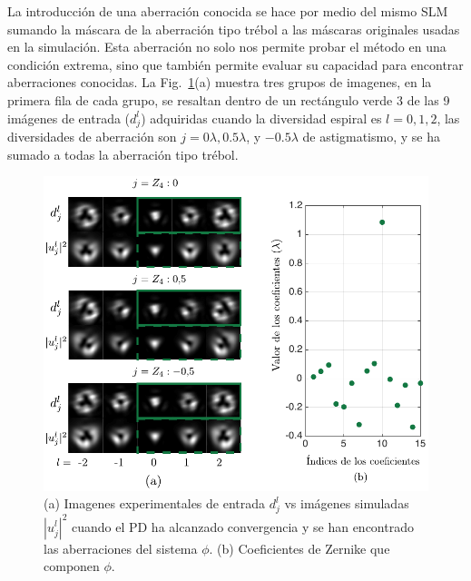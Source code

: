 La introducción de una aberración conocida se hace por medio del mismo
SLM sumando la máscara de la aberración tipo trébol a las máscaras 
originales usadas en la simulación. %
Esta aberración no solo nos permite probar el
método en una condición extrema, sino que también permite evaluar
su capacidad para encontrar aberraciones conocidas. 
La Fig.~\ref{fig:exp_results}(a) muestra tres grupos de imagenes, en
la primera fila de cada grupo, se resaltan dentro
de un rectángulo verde 3 de las 9 imágenes de entrada ($d_j^l$)
adquiridas cuando la diversidad espiral es $l=0,1,2$, las diversidades
de aberración son $j = 0\lambda, 0.5\lambda$, y  $-0.5\lambda$ de
astigmatismo, y se ha sumado a todas la aberración tipo trébol.   
\begin{figure}[h!]
\centering
\includegraphics[scale=1]{experimental_results_07032015_small.pdf}
\caption[Resultados experimentales de la reconstrucción de fase con
PD.]{(a) Imagenes experimentales de
  entrada $d_j^l$ vs imágenes simuladas $|u_j^l|^2$ cuando el PD ha
  alcanzado convergencia y se han encontrado las aberraciones del
  sistema $\phi$.  (b) Coeficientes de Zernike que componen $\phi$.} 
\label{fig:exp_results}
\end{figure} 

